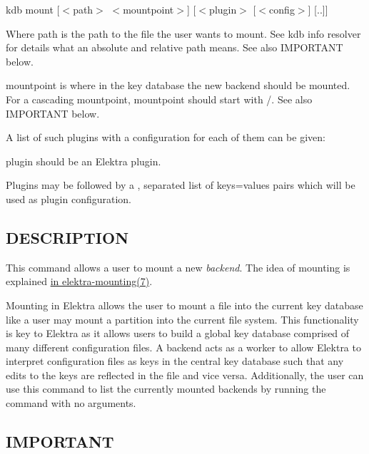 {\ttfamily kdb mount \mbox{[}$<$path$>$ $<$mountpoint$>$\mbox{]} \mbox{[}$<$plugin$>$ \mbox{[}$<$config$>$\mbox{]} \mbox{[}..\mbox{]}\mbox{]}}


\begin{DoxyItemize}
\item Where {\ttfamily path} is the path to the file the user wants to mount. See {\ttfamily kdb info resolver} for details what an absolute and relative path means. See also I\+M\+P\+O\+R\+T\+A\+NT below.
\item {\ttfamily mountpoint} is where in the key database the new backend should be mounted. For a cascading mountpoint, {\ttfamily mountpoint} should start with {\ttfamily /}. See also I\+M\+P\+O\+R\+T\+A\+NT below.
\item A list of such plugins with a configuration for each of them can be given\+:
\begin{DoxyItemize}
\item {\ttfamily plugin} should be an Elektra plugin.
\item Plugins may be followed by a {\ttfamily ,} separated list of {\ttfamily keys=values} pairs which will be used as plugin configuration.
\end{DoxyItemize}
\end{DoxyItemize}

\subsection*{D\+E\+S\+C\+R\+I\+P\+T\+I\+ON}

This command allows a user to mount a new {\itshape backend}. The idea of mounting is explained \hyperlink{md_doc_help_elektra-mounting_doc_help_elektra-mounting_md}{in elektra-\/mounting(7)}.

Mounting in Elektra allows the user to mount a file into the current key database like a user may mount a partition into the current file system. This functionality is key to Elektra as it allows users to build a global key database comprised of many different configuration files. A backend acts as a worker to allow Elektra to interpret configuration files as keys in the central key database such that any edits to the keys are reflected in the file and vice versa. Additionally, the user can use this command to list the currently mounted backends by running the command with no arguments.

\subsection*{I\+M\+P\+O\+R\+T\+A\+NT}

